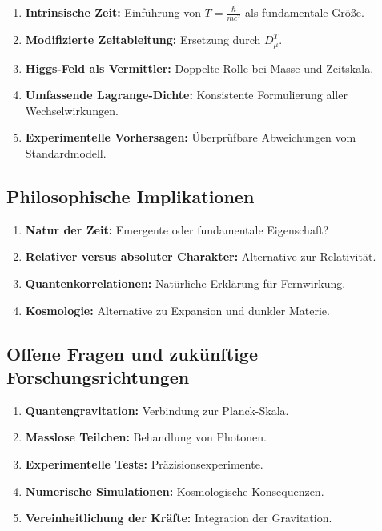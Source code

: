 \documentclass[a4paper,12pt]{article}
\begin{document}
\begin{enumerate}
	\item \textbf{Intrinsische Zeit:} Einführung von \( T = \frac{\hbar}{m c^2} \) als fundamentale Größe.
	\item \textbf{Modifizierte Zeitableitung:} Ersetzung durch \( D_\mu^T \).
	\item \textbf{Higgs-Feld als Vermittler:} Doppelte Rolle bei Masse und Zeitskala.
	\item \textbf{Umfassende Lagrange-Dichte:} Konsistente Formulierung aller Wechselwirkungen.
	\item \textbf{Experimentelle Vorhersagen:} Überprüfbare Abweichungen vom Standardmodell.
\end{enumerate}

\subsection{Philosophische Implikationen}

\begin{enumerate}
	\item \textbf{Natur der Zeit:} Emergente oder fundamentale Eigenschaft?
	\item \textbf{Relativer versus absoluter Charakter:} Alternative zur Relativität.
	\item \textbf{Quantenkorrelationen:} Natürliche Erklärung für Fernwirkung.
	\item \textbf{Kosmologie:} Alternative zu Expansion und dunkler Materie.
\end{enumerate}

\subsection{Offene Fragen und zukünftige Forschungsrichtungen}

\begin{enumerate}
	\item \textbf{Quantengravitation:} Verbindung zur Planck-Skala.
	\item \textbf{Masslose Teilchen:} Behandlung von Photonen.
	\item \textbf{Experimentelle Tests:} Präzisionsexperimente.
	\item \textbf{Numerische Simulationen:} Kosmologische Konsequenzen.
	\item \textbf{Vereinheitlichung der Kräfte:} Integration der Gravitation.
\end{enumerate}
\end{document}
